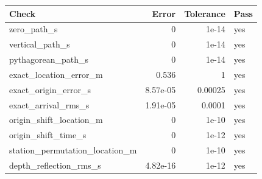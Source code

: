 \begin{tabular}{lrrl}
\toprule Check & Error & Tolerance & Pass \\
\midrule
zero\_path\_s & 0 & 1e-14 & yes \\
vertical\_path\_s & 0 & 1e-14 & yes \\
pythagorean\_path\_s & 0 & 1e-14 & yes \\
exact\_location\_error\_m & 0.536 & 1 & yes \\
exact\_origin\_error\_s & 8.57e-05 & 0.00025 & yes \\
exact\_arrival\_rms\_s & 1.91e-05 & 0.0001 & yes \\
origin\_shift\_location\_m & 0 & 1e-10 & yes \\
origin\_shift\_time\_s & 0 & 1e-12 & yes \\
station\_permutation\_location\_m & 0 & 1e-10 & yes \\
depth\_reflection\_rms\_s & 4.82e-16 & 1e-12 & yes \\
\bottomrule
\end{tabular}
